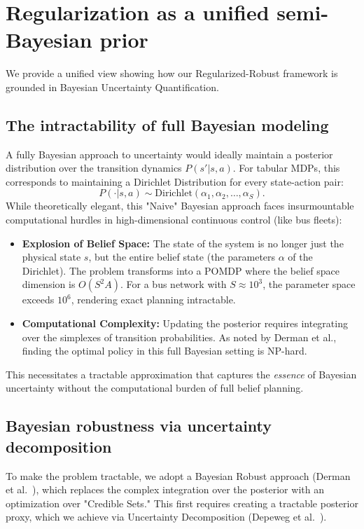 \section{Regularization as a unified semi-Bayesian prior}
\label{app:regularization_prior}
We provide a unified view showing how our Regularized-Robust framework is grounded in Bayesian Uncertainty Quantification.

\subsection{The intractability of full Bayesian modeling}
\label{app:bayes_intractability}
A fully Bayesian approach to uncertainty would ideally maintain a posterior distribution over the transition dynamics $P(s'|s,a)$. For tabular MDPs, this corresponds to maintaining a Dirichlet Distribution for every state-action pair:
\begin{equation}
    P(\cdot|s,a) \sim \text{Dirichlet}(\alpha_1, \alpha_2, \dots, \alpha_S).
\end{equation}
While theoretically elegant, this "Naive" Bayesian approach faces insurmountable computational hurdles in high-dimensional continuous control (like bus fleets):
\begin{itemize}
    \item \textbf{Explosion of Belief Space:} The state of the system is no longer just the physical state $s$, but the entire belief state (the parameters $\alpha$ of the Dirichlet). The problem transforms into a POMDP where the belief space dimension is $O(S^2 A)$. For a bus network with $S \approx 10^3$, the parameter space exceeds $10^6$, rendering exact planning intractable.
    \item \textbf{Computational Complexity:} Updating the posterior requires integrating over the simplexes of transition probabilities. As noted by Derman et al., finding the optimal policy in this full Bayesian setting is NP-hard.
\end{itemize}
This necessitates a tractable approximation that captures the \textit{essence} of Bayesian uncertainty without the computational burden of full belief planning.

\subsection{Bayesian robustness via uncertainty decomposition}
\label{app:bayes_robustness}
To make the problem tractable, we adopt a Bayesian Robust approach (Derman et al.~\cite{Derman2019BayesianRobust}), which replaces the complex integration over the posterior with an optimization over "Credible Sets." This first requires creating a tractable posterior proxy, which we achieve via Uncertainty Decomposition (Depeweg et al.~\cite{Depeweg2018Decomposition}).

